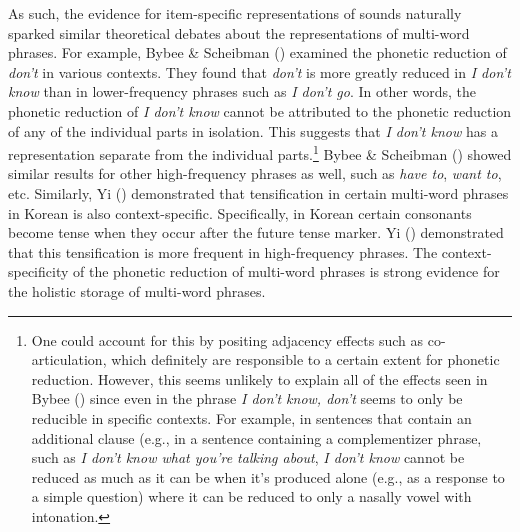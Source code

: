 \documentclass[
  12pt,
]{scrartcl}
\begin{document}
As such, the evidence for item-specific representations of sounds
naturally sparked similar theoretical debates about the representations
of multi-word phrases. For example, Bybee \& Scheibman
() examined the phonetic
reduction of \emph{don't} in various contexts. They found that
\emph{don't} is more greatly reduced in \emph{I don't know} than in
lower-frequency phrases such as \emph{I don't go}. In other words, the
phonetic reduction of \emph{I don't know} cannot be attributed to the
phonetic reduction of any of the individual parts in isolation. This
suggests that \emph{I don't know} has a representation separate from the
individual parts.\footnote{One could account for this by positing
  adjacency effects such as co-articulation, which definitely are
  responsible to a certain extent for phonetic reduction. However, this
  seems unlikely to explain all of the effects seen in Bybee
  () since even in the
  phrase \emph{I don't know, don't} seems to only be reducible in
  specific contexts. For example, in sentences that contain an
  additional clause (e.g., in a sentence containing a complementizer
  phrase, such as \emph{I don't know what you're talking about}, \emph{I
  don't know} cannot be reduced as much as it can be when it's produced
  alone (e.g., as a response to a simple question) where it can be
  reduced to only a nasally vowel with intonation.} Bybee \& Scheibman
() showed similar
results for other high-frequency phrases as well, such as \emph{have
to}, \emph{want to}, etc. Similarly, Yi
() demonstrated that
tensification in certain multi-word phrases in Korean is also
context-specific. Specifically, in Korean certain consonants become
tense when they occur after the future tense marker. Yi
() demonstrated that
this tensification is more frequent in high-frequency phrases. The
context-specificity of the phonetic reduction of multi-word phrases is
strong evidence for the holistic storage of multi-word phrases.
\end{document}
